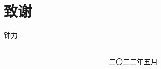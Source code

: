 {\kaishu
	\chapter*{致\qquad 谢}
	
	
	
	

\vspace{0.2cm} \hspace{11.5cm}
钟力
\hspace{10.6cm} 

~~~~~~~~~~~~~~~~~~~~~~~~~~~~~~~~~~~~~~~~~~~~~~~~~~~~~~~~~~~~~~~~~~~~~~~~~~~~~~~~~~~~~~~~~~~~~~~~~~~~~~二〇二二年五月 }
